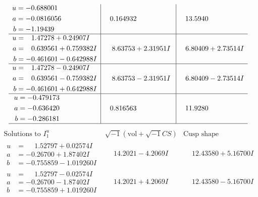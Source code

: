 \documentclass[1p]{elsarticle_modified}
\theoremstyle{definition}
\newcommand{\I}{\sqrt{-1}}
\begin{document}
$$\begin{array}{c|c|c}
\begin{aligned}
u &= -0.688001\phantom{ +0.000000I} \\
a &= -0.0816056\phantom{ +0.000000I} \\
b &= -1.19439\phantom{ +0.000000I}\end{aligned}
 & \phantom{-}0.164932\phantom{ +0.000000I} & \phantom{-}13.5940\phantom{ +0.000000I} \\ \hline\begin{aligned}
u &= \phantom{-}1.47278 + 0.24907 I \\
a &= \phantom{-}0.639561 + 0.759382 I \\
b &= -0.461601 - 0.642988 I\end{aligned}
 & \phantom{-}8.63753 + 2.31951 I & \phantom{-}6.80409 + 2.73514 I \\ \hline\begin{aligned}
u &= \phantom{-}1.47278 - 0.24907 I \\
a &= \phantom{-}0.639561 - 0.759382 I \\
b &= -0.461601 + 0.642988 I\end{aligned}
 & \phantom{-}8.63753 - 2.31951 I & \phantom{-}6.80409 - 2.73514 I \\ \hline\begin{aligned}
u &= -0.479173\phantom{ +0.000000I} \\
a &= -0.636420\phantom{ +0.000000I} \\
b &= -0.286181\phantom{ +0.000000I}\end{aligned}
 & \phantom{-}0.816563\phantom{ +0.000000I} & \phantom{-}11.9280\phantom{ +0.000000I}\\
 \hline 
 \end{array}$$\newpage$$\begin{array}{c|c|c}  
\text{Solutions to }I^u_{1}& \I (\text{vol} + \sqrt{-1}CS) & \text{Cusp shape}\\
 \hline 
\begin{aligned}
u &= \phantom{-}1.52797 + 0.02574 I \\
a &= -0.26700 + 1.87402 I \\
b &= -0.755859 - 1.019260 I\end{aligned}
 & \phantom{-}14.2021 - 4.2069 I & \phantom{-}12.43580 + 5.16700 I \\ \hline\begin{aligned}
u &= \phantom{-}1.52797 - 0.02574 I \\
a &= -0.26700 - 1.87402 I \\
b &= -0.755859 + 1.019260 I\end{aligned}
 & \phantom{-}14.2021 + 4.2069 I & \phantom{-}12.43580 - 5.16700 I \\ \hline\begin{aligned}

\end{aligned}
\end{array}$$
\end{document}
